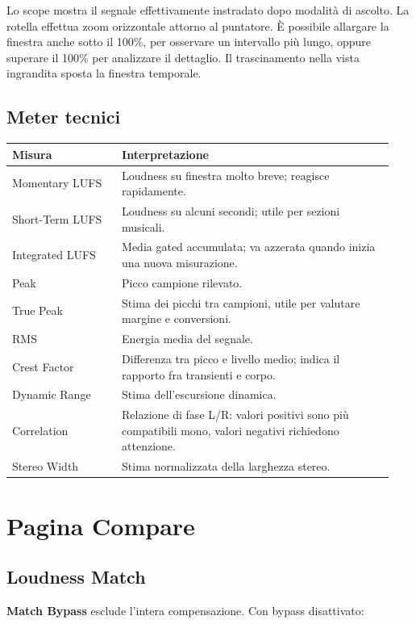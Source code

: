 \documentclass[11pt,a4paper]{article}
\newcommand{\control}[1]{\textbf{\textsf{#1}}}
\begin{document}
Lo scope mostra il segnale effettivamente instradato dopo modalità di ascolto.
La rotella effettua zoom orizzontale attorno al puntatore. È possibile
allargare la finestra anche sotto il 100\%, per osservare un intervallo più
lungo, oppure superare il 100\% per analizzare il dettaglio. Il trascinamento
nella vista ingrandita sposta la finestra temporale.

\subsection{Meter tecnici}

\begin{longtable}{p{0.27\linewidth}p{0.67\linewidth}}
\toprule
\textbf{Misura} & \textbf{Interpretazione}\\
\midrule
\endhead
Momentary LUFS & Loudness su finestra molto breve; reagisce rapidamente.\\
Short-Term LUFS & Loudness su alcuni secondi; utile per sezioni musicali.\\
Integrated LUFS & Media gated accumulata; va azzerata quando inizia una nuova
misurazione.\\
Peak & Picco campione rilevato.\\
True Peak & Stima dei picchi tra campioni, utile per valutare margine e
conversioni.\\
RMS & Energia media del segnale.\\
Crest Factor & Differenza tra picco e livello medio; indica il rapporto fra
transienti e corpo.\\
Dynamic Range & Stima dell'escursione dinamica.\\
Correlation & Relazione di fase L/R: valori positivi sono più compatibili mono,
valori negativi richiedono attenzione.\\
Stereo Width & Stima normalizzata della larghezza stereo.\\
\bottomrule
\end{longtable}

\section{Pagina Compare}

\subsection{Loudness Match}

\control{Match Bypass} esclude l'intera compensazione. Con bypass disattivato:
\end{document}
